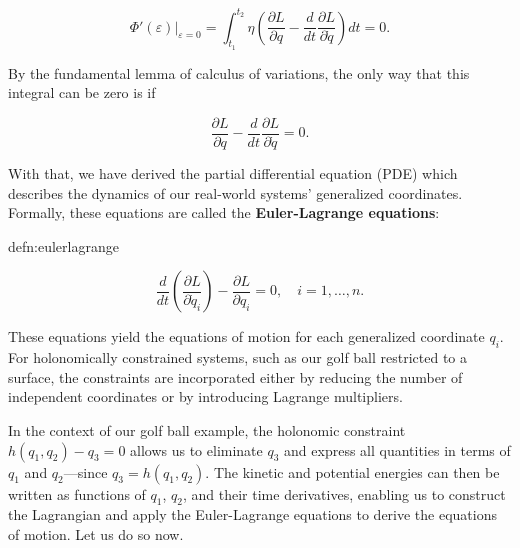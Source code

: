\begin{equation}
		\Phi'(\varepsilon)|_{\varepsilon=0}= \int_{t_1}^{t_2}\eta(\frac{\partial L}{\partial q}-\frac{d}{dt}\frac{\partial L}{\partial \dot q})dt=0.
\end{equation}

By the fundamental lemma of calculus of variations, the only way that this integral can be zero is if

\begin{equation}
	\frac{\partial L}{\partial q} - \frac{d}{dt}\frac{\partial L}{\partial \dot q} = 0.
\end{equation}

With that, we have derived the partial differential equation (PDE) which describes the dynamics of our real-world systems' generalized coordinates.
Formally, these equations are called the \textbf{Euler-Lagrange equations}:

\begin{smjdefinition}{defn:eulerlagrange}

	$$\frac{d}{dt} \left( \frac{\partial L}{\partial \dot{q}_i} \right) - \frac{\partial L}{\partial q_i} = 0, \quad i = 1, \ldots, n.
	\label{eq:eulerlagrange}$$
\end{smjdefinition}


These equations yield the equations of motion for each generalized coordinate $q_i$. For holonomically constrained systems, such as our golf ball restricted to a surface, the constraints are incorporated either by reducing the number of independent coordinates or by introducing Lagrange multipliers.

In the context of our golf ball example, the holonomic constraint $h(q_1, q_2) - q_3 = 0$ allows us to eliminate $q_3$ and express all quantities in terms of $q_1$ and $q_2$---since $q_3 = h(q_1,q_2)$. The kinetic and potential energies can then be written as functions of $q_1$, $q_2$, and their time derivatives, enabling us to construct the Lagrangian and apply the Euler-Lagrange equations to derive the equations of motion. Let us do so now.

